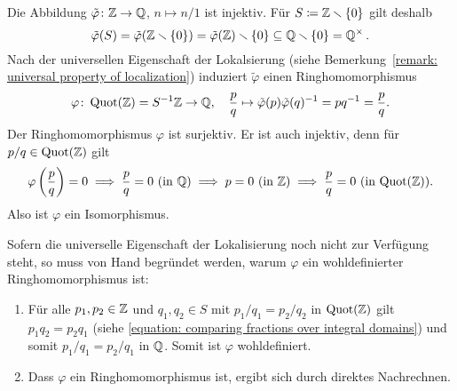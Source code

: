 \subsection{}

Die Abbildung $\tilde{\varphi} \colon \mathbb{Z} \to \mathbb{Q}$, $n \mapsto n/1$ ist injektiv.
Für $S \coloneqq \mathbb{Z} \smallsetminus \{0\}$ gilt deshalb
\[
            \tilde{\varphi}(S)
  =         \tilde{\varphi}(\mathbb{Z} \smallsetminus \{0\})
  =         \tilde{\varphi}(\mathbb{Z}) \smallsetminus \{0\}
  \subseteq \mathbb{Q} \smallsetminus \{0\}
  =         \mathbb{Q}^\times \,.
\]
Nach der universellen Eigenschaft der Lokalsierung (siehe Bemerkung~\ref{remark: universal property of localization}) induziert $\tilde{\varphi}$ einen Ringhomomorphismus
\[
          \varphi
  \colon  \operatorname{Quot}(\mathbb{Z})
  =       S^{-1} \mathbb{Z}
  \to     \mathbb{Q},
  \quad   \frac{p}{q}
  \mapsto \tilde{\varphi}(p) \tilde{\varphi}(q)^{-1}
  =       p q^{-1}
  =       \frac{p}{q}.
\]
Der Ringhomomorphismus $\varphi$ ist surjektiv.
Er ist auch injektiv, denn für $p/q \in \operatorname{Quot}(\mathbb{Z})$ gilt
\[
    \varphi\left( \frac{p}{q} \right) = 0
  \implies
    \text{$\frac{p}{q} = 0$ (in $\mathbb{Q}$)}
  \implies
    \text{$p = 0$ (in $\mathbb{Z}$)}
  \implies
    \text{$\frac{p}{q} = 0$ (in $\operatorname{Quot}(\mathbb{Z})$)}.
\]
Also ist $\varphi$ ein Isomorphismus.

\begin{remark}
  Sofern die universelle Eigenschaft der Lokalisierung noch nicht zur Verfügung steht, so muss von Hand begründet werden, warum $\varphi$ ein wohldefinierter Ringhomomorphismus ist:
  \begin{enumerate}
    \item
      Für alle $p_1, p_2 \in \mathbb{Z}$ und $q_1, q_2 \in S$ mit $p_1 / q_1 = p_2 / q_2$ in $\operatorname{Quot}(\mathbb{Z})$ gilt $p_1 q_2 = p_2 q_1$ (siehe \eqref{equation: comparing fractions over integral domains}) und somit $p_1 / q_1 = p_2 / q_1$ in $\mathbb{Q}$.
      Somit ist $\varphi$ wohldefiniert.
    \item
      Dass $\varphi$ ein Ringhomomorphismus ist, ergibt sich durch direktes Nachrechnen.
  \end{enumerate}
\end{remark}

